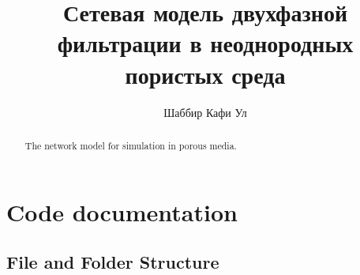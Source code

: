 \documentclass[
	12pt
] {article}
\author[1]{Шаббир Кафи Ул}
\affil[1]{Московский Физико-Технический Институт (национальный исследовательский университет)}
\title{Сетевая модель двухфазной фильтрации в неоднородных пористых среда}
\begin{document}
\maketitle
\renewcommand{\arraystretch}{1.4}

\begin{abstract}
	The network model for simulation in porous media.
\end{abstract}

\tableofcontents

\section{Code documentation}
\subsection{File and Folder Structure}
\end{document}
